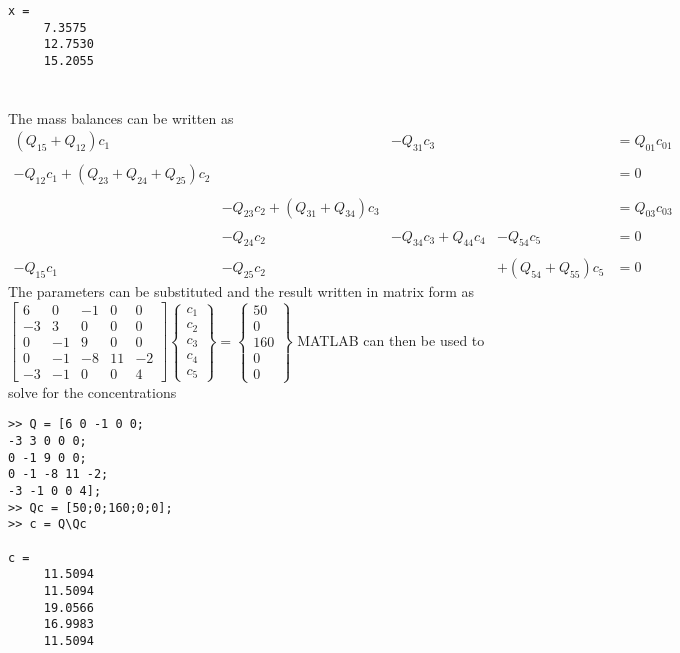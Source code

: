 \documentclass[../main.tex]{subfiles}
\begin{document}
\begin{enumerate}[label=\bfseries(\alph*)]
\begin{lstlisting}[numbers=none]
x =
 	 7.3575
 	 12.7530
 	 15.2055 
\end{lstlisting}
\bigbreak


\section{}
The mass balances can be written as
\bigbreak %
$\begin{array}{llllr}
\left(Q_{15}+Q_{12}\right) c_{1} && -Q_{31} c_{3} &&=Q_{01} c_{01} \\\\
-Q_{12} c_{1}+\left(Q_{23}+Q_{24}+Q_{25}\right) c_{2} &&&& =0 \\\\
&-Q_{23} c_{2}+\left(Q_{31}+Q_{34}\right) c_{3} &&& =Q_{03} c_{03} \\\\
&-Q_{24} c_{2} & -Q_{34} c_{3}+Q_{44} c_{4} & -Q_{54} c_{5} & =0 \\\\
-Q_{15} c_{1} & -Q_{25} c_{2} && +\left(Q_{54}+Q_{55}\right) c_{5} & =0
\end{array}$
\bigbreak
The parameters can be substituted and the result written in matrix form as
\bigbreak
$\left[\begin{array}{ccccc}
6 & 0 & -1 & 0 & 0 \\
-3 & 3 & 0 & 0 & 0 \\
0 & -1 & 9 & 0 & 0 \\
0 & -1 & -8 & 11 & -2 \\
-3 & -1 & 0 & 0 & 4
\end{array}\right]\left\{\begin{array}{l}
c_{1} \\
c_{2} \\
c_{3} \\
c_{4} \\
c_{5}
\end{array}\right\}=\left\{\begin{array}{c}
50 \\
0 \\
160 \\
0 \\
0
\end{array}\right\}$
\bigbreak
MATLAB can then be used to solve for the concentrations
\bigbreak
\begin{lstlisting}[numbers=none]
>> Q = [6 0 -1 0 0;
-3 3 0 0 0;
0 -1 9 0 0;
0 -1 -8 11 -2;
-3 -1 0 0 4];
>> Qc = [50;0;160;0;0];
>> c = Q\Qc

c =
 	 11.5094
	 11.5094
 	 19.0566
	 16.9983
 	 11.5094
\end{lstlisting}
\bigbreak


\end{enumerate}
\end{document}
